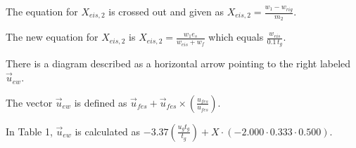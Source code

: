 The equation for \( X_{eis,2} \) is crossed out and given as \( X_{eis,2} = \frac{w_1 - w_{rig}}{m_2} \).

The new equation for \( X_{eis,2} \) is \( X_{eis,2} = \frac{w_{1} e_{s}}{w_{eis} + w_{f}} \) which equals \( \frac{w_{eis}}{0.1 \, t_{g}} \).

There is a diagram described as a horizontal arrow pointing to the right labeled \( \vec{u}_{ew} \).

The vector \( \vec{u}_{ew} \) is defined as \( \vec{u}_{fes} + \vec{u}_{fes} \times \left( \frac{u_{fes}}{u_{fes}} \right) \).

In Table 1, \( \vec{u}_{ew} \) is calculated as \( -3.37 \left( \frac{u_{g} t_{g}}{t_{g}} \right) + X \cdot \left( -2.000 \cdot 0.333 \cdot 0.500 \right) \).